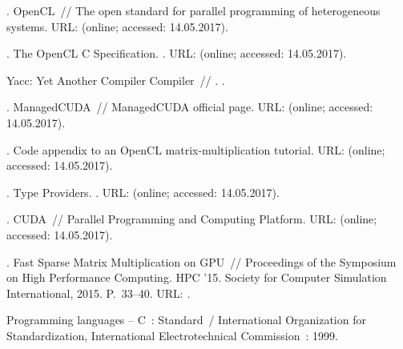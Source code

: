 \begin{thebibliography}{10}
. OpenCL~// The open standard for parallel programming
  of heterogeneous systems. \BibDash
\newblock URL:  (online; accessed:
  14.05.2017).

. The OpenCL C Specification. \BibDash
{}. \BibDash
\newblock URL:
  (online; accessed: 14.05.2017).

 Yacc: Yet Another Compiler Compiler~//
  . \BibDash
{}.

. ManagedCUDA~// ManagedCUDA official page. \BibDash
\newblock URL:  (online;
  accessed: 14.05.2017).

. Code appendix to an OpenCL matrix-multiplication tutorial.
  \BibDash
\newblock URL:  (online; accessed:
  14.05.2017).

. Type Providers. \BibDash
{}. \BibDash
\newblock URL:
  (online; accessed: 14.05.2017).

. CUDA~// Parallel Programming and Computing Platform. \BibDash
\newblock URL: 
  (online; accessed: 14.05.2017).

. Fast Sparse Matrix
  Multiplication on GPU~// Proceedings of the Symposium on High Performance
  Computing. \BibDash
\newblock HPC '15. \BibDash
\newblock Society for Computer Simulation International, 2015. \BibDash
\newblock P.~33--40. \BibDash
\newblock URL: .

Programming languages – C~: Standard~/ International Organization for
  Standardization, International Electrotechnical Commission~: 1999.


\end{thebibliography}
